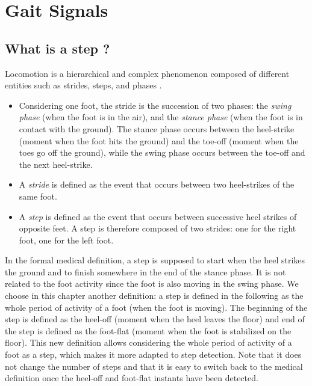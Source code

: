 \documentclass[../thesis.tex]{subfiles}
\begin{document}
\section{Gait Signals}
\label{sec:walk:data}

\subsection{What is a step ?}
\label{sub:walk:stepdef}


Locomotion is a hierarchical and complex phenomenon composed of different entities such as strides, steps, and phases \citep{auvinet2002reference, mariani}.
%
\begin{itemize}
	\item  Considering one foot, the stride is the succession of two phases:
	the \emph{swing phase} (when the foot is in the air), and the
	\emph{stance phase} (when the foot is in contact with the ground). The
	stance phase occurs between the heel-strike (moment when the foot hits
	the ground) and the toe-off (moment when the toes go off the ground),
	while the swing phase occurs between the toe-off and the next
	heel-strike.
	\item A \emph{stride} is defined as the event that occurs between two
	heel-strikes of the same foot.
	\item A \emph{step} is defined as the event that occurs between
	successive heel strikes of opposite feet. A step is therefore composed
	of two strides: one for the right foot, one for the left foot.
\end{itemize}
%
In the formal medical definition, a step is supposed to start when the heel strikes the ground and to finish somewhere in the end of the stance phase. It is not related to the foot activity since the foot is also moving in the swing phase. We choose in this chapter another definition: a step is defined in the following as the whole period of activity of a foot (when the foot is moving).  The beginning of the step is  defined as the heel-off (moment when the heel leaves the floor) and end of the step is defined as the foot-flat (moment when the foot is stabilized on the floor). This new definition allows considering the whole period of activity of a foot as a step, which makes it more adapted to step detection. Note that it does not change the number of steps and that it is easy to switch back to the medical definition once the heel-off and foot-flat instants have been detected.

\end{document}
